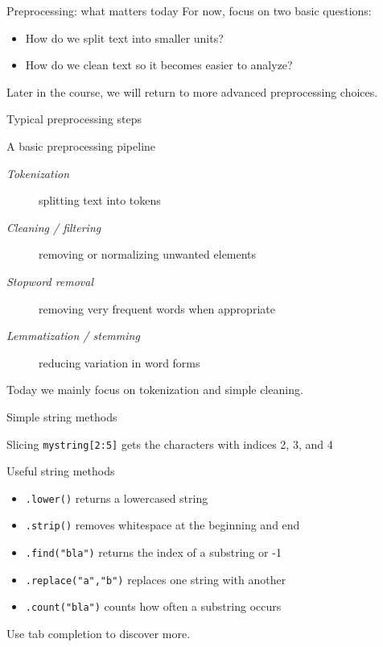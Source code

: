 \documentclass[handout]{beamer}
\begin{document}
\begin{frame}{Preprocessing: what matters today}
For now, focus on two basic questions:
\begin{itemize}
	\item How do we split text into smaller units?
	\item How do we clean text so it becomes easier to analyze?
\end{itemize}

\vspace{0.3cm}
Later in the course, we will return to more advanced preprocessing choices.
\end{frame}

\begin{frame}{Typical preprocessing steps}
\begin{block}{A basic preprocessing pipeline}
\begin{description}
    \item[\emph{Tokenization}] splitting text into tokens
    \item[\emph{Cleaning / filtering}] removing or normalizing unwanted elements
    \item[\emph{Stopword removal}] removing very frequent words when appropriate
    \item[\emph{Lemmatization / stemming}] reducing variation in word forms
\end{description}
\end{block}

\vspace{0.3cm}
Today we mainly focus on tokenization and simple cleaning.
\end{frame}

\begin{frame}[fragile]{Simple string methods}
\begin{block}{Slicing}
\texttt{mystring[2:5]} gets the characters with indices 2, 3, and 4
\end{block}

\begin{block}{Useful string methods}
\begin{itemize}
	\item \texttt{.lower()} returns a lowercased string
	\item \texttt{.strip()} removes whitespace at the beginning and end
	\item \texttt{.find("bla")} returns the index of a substring or -1
	\item \texttt{.replace("a","b")} replaces one string with another
	\item \texttt{.count("bla")} counts how often a substring occurs
\end{itemize}
Use tab completion to discover more.
\end{block}
\end{frame}
\end{document}

